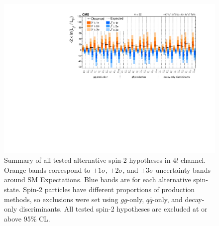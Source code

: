 \begin{figure}[htbp]
\begin{center}
\includegraphics[width=.9\linewidth]{HiggsProperties/figures/JP_SummaryPlot.pdf}
\caption[Summary of Spin-2 Exclusion Limits in $4l$ for $125.6$ $\rm{GeV}$ Higgs Boson]{Summary of all tested alternative spin-2 hypotheses in $4l$ channel. Orange bands correspond to $\pm1\sigma$, $\pm2\sigma$, and $\pm3\sigma$ uncertainty bands around SM Expectations. Blue bands are for each alternative spin-state. Spin-2 particles have different proportions of production methods, so exclusions were set using $gg$-only, $q\bar{q}$-only, and decay-only discriminants. All tested spin-2 hypotheses are excluded at or above 95\% CL.}
\label{fig:Spin2Exclusions}
\end{center}
\end{figure}

